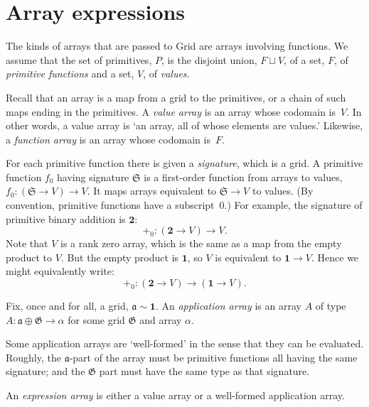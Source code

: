\documentclass[11pt]{article}
\newcommand{\gr}[1]{\mathfrak{#1}}
\newcommand{\unit}{\mathbf{1}}
\begin{document}
\section{Array expressions}

The kinds of arrays that are passed to Grid are arrays involving functions. We
assume that the set of primitives, $P$, is the disjoint union, $F \sqcup V$, of a
set, $F$, of \emph{primitive functions} and a set, $V$, of \emph{values}.

Recall that an array is a map from a grid to the primitives, or a chain of such
maps ending in the primitives. A \emph{value array} is an array whose codomain
is~$V$. In other words, a value array is `an array, all of whose elements are
values.' Likewise, a \emph{function array} is an array whose codomain is~$F$.

For each primitive function there is given a \emph{signature}, which is a
grid. A primitive function $f_0$ having signature $\gr{S}$ is a first-order
function from arrays to values, $f_0: (\gr{S} \to V) \to V$. It maps arrays
equivalent to $\gr{S}\to V$ to values. (By convention, primitive functions have a
subscript~0.) For example, the signature of primitive binary addition is
$\mathbf{2}$:
\begin{equation*}
+_0: (\mathbf{2} \to V) \to V.
\end{equation*}
Note that $V$ is a rank zero array, which is the same as a map from the empty
product to $V$. But the empty product is $\mathbf{1}$, so $V$ is equivalent to
$\mathbf{1}\to V$. Hence we might equivalently write:
\begin{equation*}
+_0: (\mathbf{2} \to V) \to (\mathbf{1} \to V).
\end{equation*}

Fix, once and for all, a grid, $\gr{a} \sim \mathbf{1}$. An \emph{application
array} is an array $A$ of type $A: \gr{a}\oplus\gr{G} \to \alpha$ for some grid
$\gr{G}$ and array $\alpha$. 

Some application arrays are `well-formed' in the sense that they can be
evaluated. Roughly, the $\gr{a}$-part of the array must be primitive
functions all having the same signature; and the $\gr{G}$ part must have the
same type as that signature.

An \emph{expression array} is either a value array or a well-formed application
array.






\end{document}
